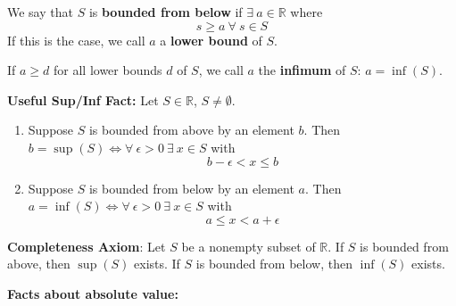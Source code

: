 \begin{definition} We say that \(S\) is \textbf{bounded from below} if \(\exists \ a \in \mathbb{R}\) where \[s \geq a \ \forall \ s \in S\]If this is the case, we call \(a\) a \textbf{lower bound} of \(S\).

If \(a \geq d \) for all lower bounds \(d\) of \(S\), we call \(a\) the \textbf{infimum} of \(S\): \(a = \inf(S)\).
\end{definition}

\begin{proposition} \textbf{Useful Sup/Inf Fact:} Let \(S \in \mathbb{R}\), \(S \neq \emptyset\). 

\begin{enumerate}[(1)]

\item Suppose \(S\) is bounded from above by an element \(b\). Then \(b = \sup(S) \iff \forall \ \epsilon >0 \ \exists \ x \in S\) with \[b - \epsilon < x \leq b\]

\item Suppose \(S\) is bounded from below by an element \(a\). Then \(a = \inf(S) \iff \forall \ \epsilon >0 \ \exists \ x \in S\) with \[a \leq x < a + \epsilon\]

\end{enumerate}

\end{proposition}

\textbf{Completeness Axiom}: Let \(S\) be a nonempty subset of \(\mathbb{R}\). If \(S\) is bounded from above, then \(\sup(S)\) exists. If \(S\) is bounded from below, then \(\inf(S)\) exists.


\textbf{Facts about absolute value:}

